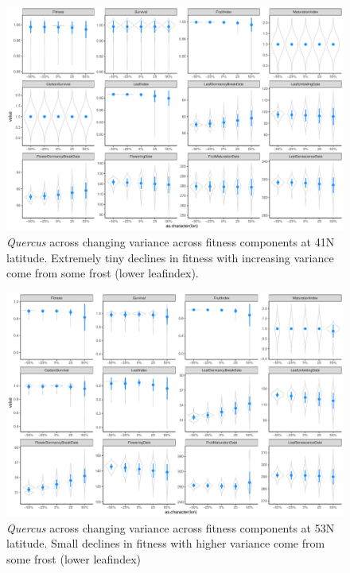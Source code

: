 \documentclass[11pt,letter]{article}
\begin{document}
\begin{figure} 
 \begin{center}
\noindent \includegraphics[width=1\textwidth]{..//analyses/graphs/phenofit/sims/sdsim41_allmetricsQR.pdf}
  \caption{\emph{Quercus} across changing variance across fitness components at 41\degree N latitude. Extremely tiny declines in fitness with increasing variance come from some frost (lower leafindex).}
  \label{fig:quercussd41}
  \end{center}
\end{figure}

\begin{figure} 
 \begin{center}
\noindent \includegraphics[width=1\textwidth]{..//analyses/graphs/phenofit/sims/sdsim53_allmetricsQR.pdf}
  \caption{\emph{Quercus} across changing variance across fitness components at 53\degree N latitude. Small declines in fitness with higher variance come from some frost (lower leafindex)}
  \label{fig:quercussd53}
  \end{center}
\end{figure}
\newpage
\end{document}
